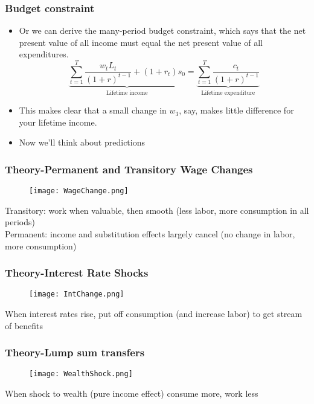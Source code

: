 \documentclass{beamer}
\begin{document}
\begin{frame}
\frametitle{Budget constraint}
\begin{itemize}
\item Or we can derive the many-period budget constraint, which says that the net present value of all income must equal the net present value of all expenditures.  
$$\underbrace{\sum_{t=1}^T\frac{w_tL_t}{(1+r)^{t-1}}+(1+r_t)s_{0}}_{\text{Lifetime income}}=\underbrace{\sum_{t=1}^T\frac{c_t}{(1+r)^{t-1}}}_{\text{Lifetime expenditure}}$$
\item This makes clear that a small change in $w_3$, say, makes little difference for your lifetime income.
\bigskip
\item Now we'll think about predictions
\end{itemize}
\end{frame}

\begin{frame}
\frametitle{Theory-Permanent and Transitory Wage Changes}
\begin{figure}
\centering
\texttt{[image: WageChange.png]}
\end{figure}
Transitory: work when valuable, then smooth (less labor, more consumption in all periods)\\
Permanent: income and substitution effects largely cancel (no change in labor, more consumption)
\end{frame}

\begin{frame}
\frametitle{Theory-Interest Rate Shocks}
\begin{figure}
\centering
\texttt{[image: IntChange.png]}
\end{figure}
When interest rates rise, put off consumption (and increase labor) to get stream of benefits
\end{frame}

\begin{frame}
\frametitle{Theory-Lump sum transfers }
\begin{figure}
\centering
\texttt{[image: WealthShock.png]}
\end{figure}
When shock to wealth (pure income effect) consume more, work less
\end{frame}
\end{document}
